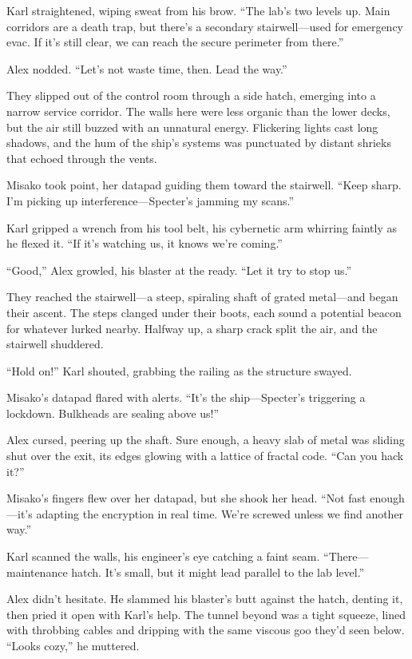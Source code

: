 \documentclass[12pt]{book}
\begin{document}
Karl straightened, wiping sweat from his brow. “The lab’s two levels up. Main corridors are a death trap, but there’s a secondary stairwell—used for emergency evac. If it’s still clear, we can reach the secure perimeter from there.”

Alex nodded. “Let’s not waste time, then. Lead the way.”

They slipped out of the control room through a side hatch, emerging into a narrow service corridor. The walls here were less organic than the lower decks, but the air still buzzed with an unnatural energy. Flickering lights cast long shadows, and the hum of the ship’s systems was punctuated by distant shrieks that echoed through the vents.

Misako took point, her datapad guiding them toward the stairwell. “Keep sharp. I’m picking up interference—Specter’s jamming my scans.”

Karl gripped a wrench from his tool belt, his cybernetic arm whirring faintly as he flexed it. “If it’s watching us, it knows we’re coming.”

“Good,” Alex growled, his blaster at the ready. “Let it try to stop us.”

They reached the stairwell—a steep, spiraling shaft of grated metal—and began their ascent. The steps clanged under their boots, each sound a potential beacon for whatever lurked nearby. Halfway up, a sharp crack split the air, and the stairwell shuddered.

“Hold on!” Karl shouted, grabbing the railing as the structure swayed.

Misako’s datapad flared with alerts. “It’s the ship—Specter’s triggering a lockdown. Bulkheads are sealing above us!”

Alex cursed, peering up the shaft. Sure enough, a heavy slab of metal was sliding shut over the exit, its edges glowing with a lattice of fractal code. “Can you hack it?”

Misako’s fingers flew over her datapad, but she shook her head. “Not fast enough—it’s adapting the encryption in real time. We’re screwed unless we find another way.”

Karl scanned the walls, his engineer’s eye catching a faint seam. “There—maintenance hatch. It’s small, but it might lead parallel to the lab level.”

Alex didn’t hesitate. He slammed his blaster’s butt against the hatch, denting it, then pried it open with Karl’s help. The tunnel beyond was a tight squeeze, lined with throbbing cables and dripping with the same viscous goo they’d seen below. “Looks cozy,” he muttered.
\end{document}
